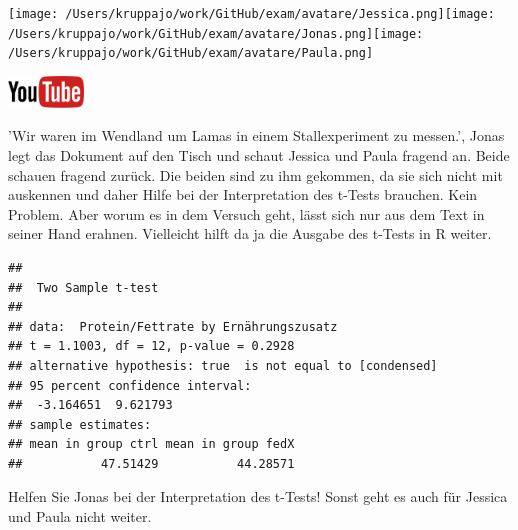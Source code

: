 \documentclass[a4paper, 9pt]{scrartcl}\usepackage[]{graphicx}\usepackage[]{xcolor}
\makeatletter
\newenvironment{kframe}{%
 \def\at@end@of@kframe{}%
 \ifinner\ifhmode%
  \def\at@end@of@kframe{\end{minipage}}%
  \begin{minipage}{\columnwidth}%
 \fi\fi%
 \def\FrameCommand##1{\hskip\@totalleftmargin \hskip-\fboxsep
 \colorbox{shadecolor}{##1}\hskip-\fboxsep
     \hskip-\linewidth \hskip-\@totalleftmargin \hskip\columnwidth}%
 \MakeFramed {\advance\hsize-\width
   \@totalleftmargin\z@ \linewidth\hsize
   \@setminipage}}%
 {\par\unskip\endMakeFramed%
 \at@end@of@kframe}
\newenvironment{knitrout}{}{} %
\makeatother
\begin{document}
 
\begin{minipage}[t]{0.5\textwidth}
\texttt{[image: /Users/kruppajo/work/GitHub/exam/avatare/Jessica.png]}\hspace{-4mm}\texttt{[image: /Users/kruppajo/work/GitHub/exam/avatare/Jonas.png]}\hspace{-4mm}\texttt{[image: /Users/kruppajo/work/GitHub/exam/avatare/Paula.png]}
\end{minipage}
\begin{minipage}[t]{0.5\textwidth}
\hfill
\href{https://youtu.be/w62HJlbN28U}{\includegraphics[width = 2cm]{img/youtube}}
\end{minipage}
\vspace{1ex}



'Wir waren im Wendland um Lamas in einem Stallexperiment zu messen.', Jonas legt das Dokument auf den Tisch und schaut Jessica und Paula fragend an. Beide schauen fragend zurück. Die beiden sind zu ihm gekommen, da sie sich nicht mit \Rlogo auskennen und daher Hilfe bei der Interpretation des t-Tests brauchen. Kein Problem. Aber worum es in dem Versuch geht, lässt sich nur aus dem Text in seiner Hand erahnen. Vielleicht hilft da ja die Ausgabe des t-Tests in R weiter.

\begin{knitrout}
\color{fgcolor}\begin{kframe}
\begin{verbatim}
## 
## 	Two Sample t-test
## 
## data:  Protein/Fettrate by Ernährungszusatz
## t = 1.1003, df = 12, p-value = 0.2928
## alternative hypothesis: true  is not equal to [condensed]
## 95 percent confidence interval:
##  -3.164651  9.621793
## sample estimates:
## mean in group ctrl mean in group fedX 
##           47.51429           44.28571
\end{verbatim}
\end{kframe}
\end{knitrout}

Helfen Sie Jonas bei der Interpretation des t-Tests! Sonst geht es auch für Jessica und Paula nicht weiter.
  
\end{document}
